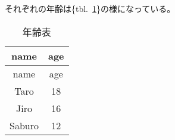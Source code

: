 それぞれの年齢は\{tbl.~\ref{tbl:age_tbl}\}の様になっている。

\hypertarget{tbl:age_tbl}{}
\begin{longtable}[]{@{}cc@{}}
\caption{\label{tbl:age_tbl}年齢表}\tabularnewline
\toprule
name & age\tabularnewline
\midrule
\endfirsthead
\toprule
name & age\tabularnewline
\midrule
\endhead
Taro & 18\tabularnewline
Jiro & 16\tabularnewline
Saburo & 12\tabularnewline
\bottomrule
\end{longtable}
